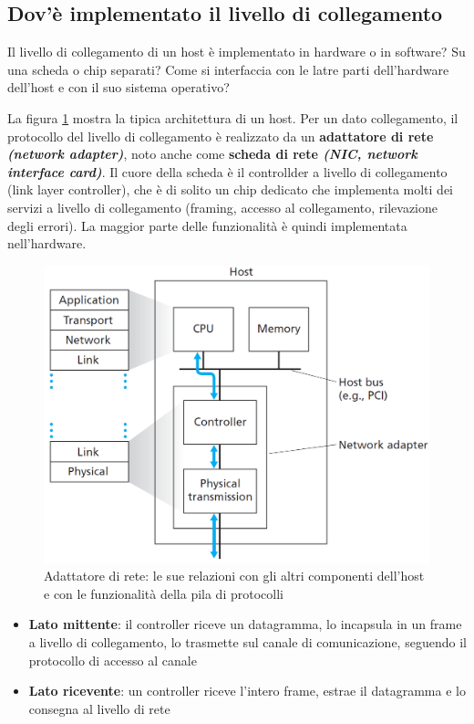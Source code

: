 \documentclass[11pt,a4paper]{book}
\begin{document}
\subsection{Dov'è implementato il livello di collegamento}
Il livello di collegamento di un host è implementato in hardware o in software? Su una scheda o chip separati? Come si interfaccia con le latre parti dell'hardware dell'host e con il suo sistema operativo?

La figura \ref{fig: 069} mostra la tipica architettura di un host. Per un dato collegamento, il protocollo del livello di collegamento è realizzato da un \textbf{adattatore di rete \textit{(network adapter)}}, noto anche come \textbf{scheda di rete \textit{(NIC, network interface card)}}. Il cuore della scheda è il controllder a livello di collegamento (link layer controller), che è di solito un chip dedicato che implementa molti dei servizi a livello di collegamento (framing, accesso al collegamento, rilevazione degli errori). La maggior parte delle funzionalità è quindi implementata nell'hardware.
\begin{figure}
	\begin{center}
		\includegraphics[scale=0.6]{img/069.png}
		\caption{Adattatore di rete: le sue relazioni con gli altri componenti dell'host e con le funzionalità della pila di protocolli}
		\label{fig: 069}
	\end{center}
\end{figure}
\begin{itemize}
	\item \textbf{Lato mittente}: il controller riceve un datagramma, lo incapsula in un frame a livello di collegamento, lo trasmette sul canale di comunicazione, seguendo il protocollo di accesso al canale
	\item \textbf{Lato ricevente}: un controller riceve l'intero frame, estrae il datagramma e lo consegna al livello di rete
\end{itemize}
\end{document}
